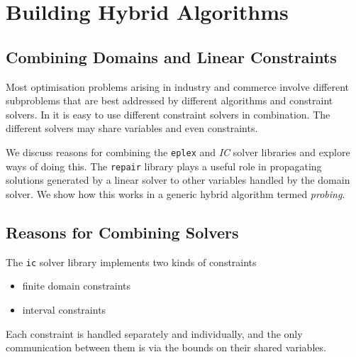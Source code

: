 %
% 
% 
% 
% 

\chapter{Building Hybrid Algorithms}
\label{chaphybrid}

\section{Combining Domains and Linear Constraints}
Most optimisation problems arising in industry and commerce involve
different subproblems that are best addressed by different algorithms
and constraint solvers. In \eclipse{} it is easy to use different
constraint solvers in combination.  The different solvers may share
variables and even constraints.

We discuss reasons for combining the {\tt eplex} and {\em
IC} solver libraries and explore ways of doing this.  The {\tt repair}
library plays a useful role in propagating solutions generated by a
linear solver to other variables handled by the domain solver.
We show how this works in a generic hybrid algorithm termed {\em
probing}.

\section{Reasons for Combining Solvers}
The {\tt ic} solver library implements two kinds of constraints
\begin{itemize}
\item finite domain constraints
\item interval constraints
\end{itemize}
Each constraint is handled separately and individually, and the only
communication between them is via the bounds on their shared
variables. 

